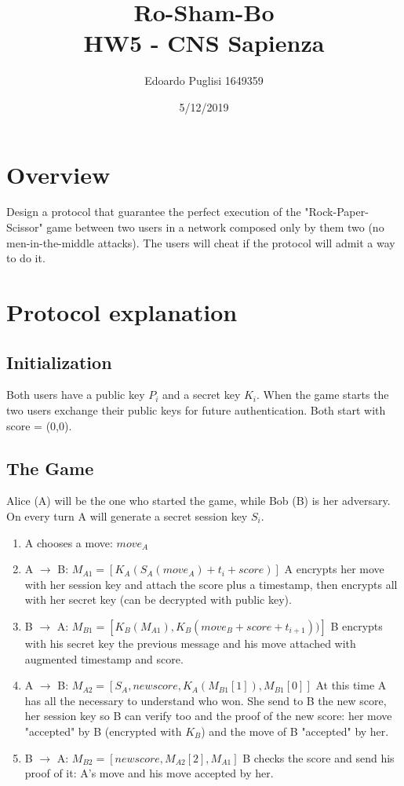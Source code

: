 \documentclass[11pt,a4paper]{article}
\title{Ro-Sham-Bo \\ HW5 - CNS Sapienza}
\author{Edoardo Puglisi 1649359}
\date{5/12/2019}
\begin{document}
\lstset{breaklines=true}
	
\maketitle
\tableofcontents
\clearpage

\section{Overview}
Design a protocol that guarantee the perfect execution of the "Rock-Paper-Scissor" game between two users in a network composed only by them two (no men-in-the-middle attacks). The users will cheat if the protocol will admit a way to do it.

\section{Protocol explanation}

\subsection{Initialization}
Both users have a public key $P_i$ and a secret key $K_i$. When the game starts the two users exchange their public keys for future authentication. Both start with score = (0,0).

\subsection{The Game}
Alice (A) will be the one who started the game, while Bob (B) is her adversary. On every turn A will generate a secret session key $S_i$.
\begin{enumerate}
    \item A chooses a move: $move_A$
    \item A $\rightarrow$ B: $M_{A1} =[K_A(S_A(move_A) + t_i + score)]$ \newline
    A encrypts her move with her session key and attach the score plus a timestamp, then encrypts all with her secret key (can be decrypted with public key).
    \item B $\rightarrow$ A: $M_{B1} = [K_B(M_{A1}), K_B(move_B + score + t_{i+1}))]$ \newline
    B encrypts with his secret key the previous message and his move attached with augmented timestamp and score.
    \item A $\rightarrow$ B: $M_{A2} = [S_A, newscore, K_A(M_{B1}[1]),M_{B1}[0]]$ \newline
    At this time A has all the necessary to understand who won. She send to B the new score, her session key so B can verify too and the proof of the new score: her move "accepted" by B (encrypted with $K_B$) and the move of B "accepted" by her.
    \item B $\rightarrow$ A: $M_{B2} = [newscore,M_{A2}[2],M_{A1}]$ \newline
    B checks the score and send his proof of it: A's move and his move accepted by her.
\end{enumerate}
\end{document}
